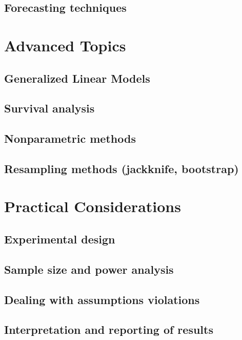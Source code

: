 \documentclass{article}
\begin{document}
  \subsection{Forecasting techniques}

\section{Advanced Topics}

  \subsection{Generalized Linear Models}

  \subsection{Survival analysis}

  \subsection{Nonparametric methods}

  \subsection{Resampling methods (jackknife, bootstrap)}

\section{Practical Considerations}

  \subsection{Experimental design}

  \subsection{Sample size and power analysis}

  \subsection{Dealing with assumptions violations}

  \subsection{Interpretation and reporting of results}



\end{document}
